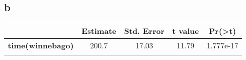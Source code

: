\documentclass[]{book}
\newenvironment{Shaded}{\begin{snugshade}}{\end{snugshade}}
\newcommand{\KeywordTok}[1]{\textcolor[rgb]{0.13,0.29,0.53}{\textbf{{#1}}}}
\newcommand{\StringTok}[1]{\textcolor[rgb]{0.31,0.60,0.02}{{#1}}}
\newcommand{\NormalTok}[1]{{#1}}
\theoremstyle{definition}
\theoremstyle{definition}
\theoremstyle{remark}
\begin{document}
\subsection*{b}\label{b-24}

\begin{Shaded}
\end{Shaded}

\begin{longtable}[c]{@{}ccccc@{}}
\toprule
\begin{minipage}[b]{0.26\columnwidth}\centering\strut
~
\strut\end{minipage} &
\begin{minipage}[b]{0.13\columnwidth}\centering\strut
Estimate
\strut\end{minipage} &
\begin{minipage}[b]{0.16\columnwidth}\centering\strut
Std. Error
\strut\end{minipage} &
\begin{minipage}[b]{0.12\columnwidth}\centering\strut
t value
\strut\end{minipage} &
\begin{minipage}[b]{0.12\columnwidth}\centering\strut
Pr(\textgreater{}\textbar{}t\textbar{})
\strut\end{minipage}\tabularnewline
\midrule
\endhead
\begin{minipage}[t]{0.26\columnwidth}\centering\strut
\textbf{time(winnebago)}
\strut\end{minipage} &
\begin{minipage}[t]{0.13\columnwidth}\centering\strut
200.7
\strut\end{minipage} &
\begin{minipage}[t]{0.16\columnwidth}\centering\strut
17.03
\strut\end{minipage} &
\begin{minipage}[t]{0.12\columnwidth}\centering\strut
11.79
\strut\end{minipage} &
\begin{minipage}[t]{0.12\columnwidth}\centering\strut
1.777e-17
\strut\end{minipage}\tabularnewline
\begin{minipage}[t]{0.26\columnwidth}\centering\strut

\end{minipage}
\end{longtable}
\end{document}
